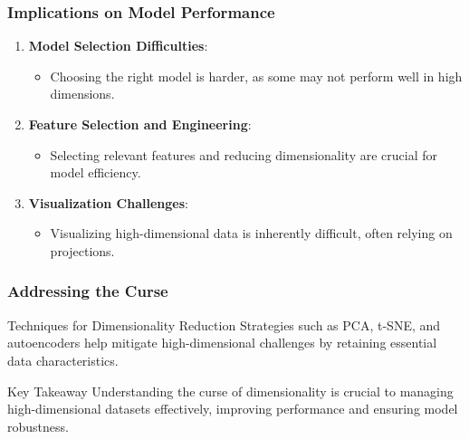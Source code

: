\documentclass[aspectratio=169]{beamer}
\begin{document}
\begin{frame}[fragile]
    \frametitle{Implications on Model Performance}
    \begin{enumerate}
        \item \textbf{Model Selection Difficulties}:
        \begin{itemize}
            \item Choosing the right model is harder, as some may not perform well in high dimensions.
        \end{itemize}
        
        \item \textbf{Feature Selection and Engineering}:
        \begin{itemize}
            \item Selecting relevant features and reducing dimensionality are crucial for model efficiency.
        \end{itemize}
        
        \item \textbf{Visualization Challenges}:
        \begin{itemize}
            \item Visualizing high-dimensional data is inherently difficult, often relying on projections.
        \end{itemize}
    \end{enumerate}
\end{frame}

\begin{frame}[fragile]
    \frametitle{Addressing the Curse}
    \begin{block}{Techniques for Dimensionality Reduction}
        Strategies such as PCA, t-SNE, and autoencoders help mitigate high-dimensional challenges by retaining essential data characteristics.
    \end{block}
    
    \begin{block}{Key Takeaway}
        Understanding the curse of dimensionality is crucial to managing high-dimensional datasets effectively, improving performance and ensuring model robustness.
    \end{block}
\end{frame}
\end{document}
